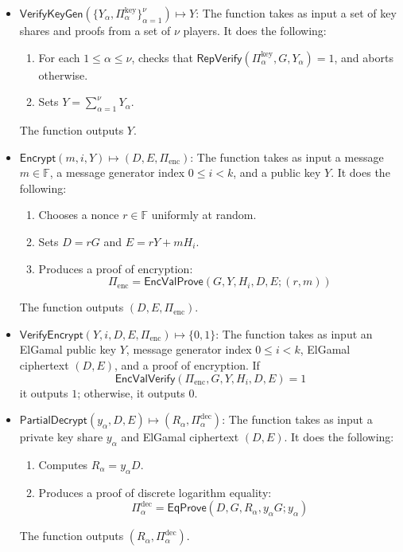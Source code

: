 \documentclass{llncs}
\newcommand{\F}{\mathbb{F}}
\newcommand{\func}[1]{\mathsf{#1}}
\begin{document}
\begin{itemize}
    \item $\func{VerifyKeyGen}(\{Y_\alpha, \Pi_\alpha^{\text{key}}\}_{\alpha=1}^{\nu}) \mapsto Y$: The function takes as input a set of key shares and proofs from a set of $\nu$ players.
    It does the following:
    \begin{enumerate}
        \item For each $1 \leq \alpha \leq \nu$, checks that $\func{RepVerify}(\Pi_\alpha^{\text{key}}, G, Y_\alpha) = 1$, and aborts otherwise.
        \item Sets $Y = \sum_{\alpha=1}^{\nu} Y_\alpha$.
    \end{enumerate}
    The function outputs $Y$.
    
    \item $\func{Encrypt}(m, i, Y) \mapsto (D, E, \Pi_{\text{enc}})$: The function takes as input a message $m \in \F$, a message generator index $0 \leq i < k$, and a public key $Y$.
    It does the following:
    \begin{enumerate}
        \item Chooses a nonce $r \in \F$ uniformly at random.
        \item Sets $D = rG$ and $E = rY + mH_i$.
        \item Produces a proof of encryption: \[ \Pi_{\text{enc}} = \func{EncValProve}(G, Y, H_i, D, E ; (r, m)) \]
    \end{enumerate}
    The function outputs $(D, E, \Pi_{\text{enc}})$.
    
    \item $\func{VerifyEncrypt}(Y, i, D, E, \Pi_{\text{enc}}) \mapsto \{0, 1\}$: The function takes as input an ElGamal public key $Y$, message generator index $0 \leq i < k$, ElGamal ciphertext $(D, E)$, and a proof of encryption.
    If \[ \func{EncValVerify}(\Pi_{\text{enc}}, G, Y, H_i, D, E) = 1 \] it outputs $1$; otherwise, it outputs $0$.
    
    \item $\func{PartialDecrypt}(y_\alpha, D, E) \mapsto (R_\alpha, \Pi_\alpha^{\text{dec}})$: The function takes as input a private key share $y_\alpha$ and ElGamal ciphertext $(D, E)$.
    It does the following:
    \begin{enumerate}
        \item Computes $R_\alpha = y_\alpha D$.
        \item Produces a proof of discrete logarithm equality: \[ \Pi_\alpha^{\text{dec}} = \func{EqProve}(D, G, R_\alpha, y_\alpha G ; y_\alpha) \]
    \end{enumerate}
    The function outputs $(R_\alpha, \Pi_\alpha^{\text{dec}})$.
    

\end{itemize}
\end{document}
